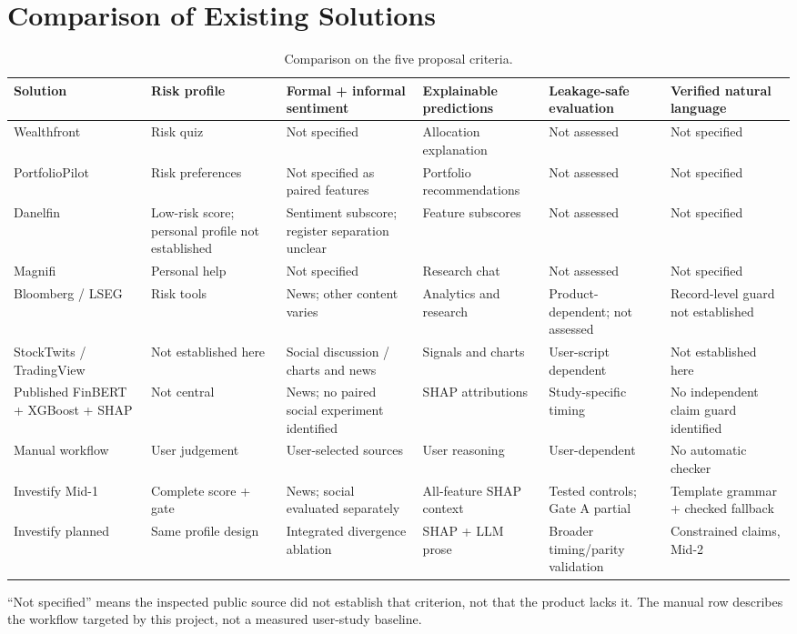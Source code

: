 \section{Comparison of Existing Solutions}
\begingroup\small
\begin{longtable}{p{}p{}p{}p{}p{}p{}}
\caption{Comparison on the five proposal criteria.}\label{tab:existing-solutions}\\\toprule Solution & Risk profile & Formal + informal sentiment & Explainable predictions & Leakage-safe evaluation & Verified natural language\\\midrule
Wealthfront & Risk quiz & Not specified & Allocation explanation & Not assessed & Not specified\\
PortfolioPilot & Risk preferences & Not specified as paired features & Portfolio recommendations & Not assessed & Not specified\\
Danelfin & Low-risk score; personal profile not established & Sentiment subscore; register separation unclear & Feature subscores & Not assessed & Not specified\\
Magnifi & Personal help & Not specified & Research chat & Not assessed & Not specified\\
Bloomberg / LSEG & Risk tools & News; other content varies & Analytics and research & Product-dependent; not assessed & Record-level guard not established\\
StockTwits / TradingView & Not established here & Social discussion / charts and news & Signals and charts & User-script dependent & Not established here\\
Published FinBERT + XGBoost + SHAP & Not central & News; no paired social experiment identified & SHAP attributions & Study-specific timing & No independent claim guard identified\\
Manual workflow & User judgement & User-selected sources & User reasoning & User-dependent & No automatic checker\\
Investify Mid-1 & Complete score + gate & News; social evaluated separately & All-feature SHAP context & Tested controls; Gate A partial & Template grammar + checked fallback\\
Investify planned & Same profile design & Integrated divergence ablation & SHAP + LLM prose & Broader timing/parity validation & Constrained claims, Mid-2\\
\bottomrule\end{longtable}
\endgroup
``Not specified'' means the inspected public source did not establish that criterion, not that the product lacks it. The manual row describes the workflow targeted by this project, not a measured user-study baseline.
